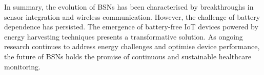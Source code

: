 \noindent In summary, the evolution of BSNs has been characterised by breakthroughs in sensor integration and wireless communication. However, the challenge of battery dependence has persisted. The emergence of battery-free IoT devices powered by energy harvesting techniques presents a transformative solution. As ongoing research continues to address energy challenges and optimise device performance, the future of BSNs holds the promise of continuous and sustainable healthcare monitoring.